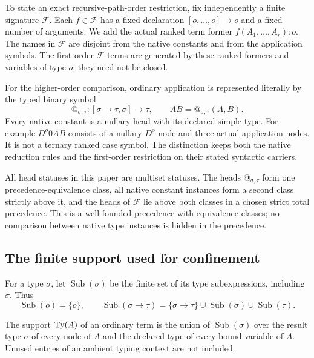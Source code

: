 To state an exact recursive-path-order restriction, fix independently a
finite signature $\mathcal F$.  Each $f\in\mathcal F$ has a fixed declaration
$[o,\ldots,o]\to o$ and a fixed number of arguments.  We add the actual
ranked term former $f(A_1,\ldots,A_r):o$.  The names in $\mathcal F$ are
disjoint from the native constants and from the application symbols.
The first-order $\mathcal F$-terms are generated by these ranked formers
and variables of type $o$; they need not be closed.

For the higher-order comparison, ordinary application is represented
literally by the typed binary symbol
\[
 @_{\sigma,\tau}:[\sigma\to\tau,\sigma]\to\tau,
 \qquad
 AB=@_{\sigma,\tau}(A,B).
\]
Every native constant is a nullary head with its declared simple type.
For example $D^o0AB$ consists of a nullary $D^o$ node and three actual
application nodes.  It is not a ternary ranked case symbol.  The distinction
keeps both the native reduction rules and the first-order restriction on
their stated syntactic carriers.

All head statuses in this paper are multiset statuses.  The heads
$@_{\sigma,\tau}$ form one precedence-equivalence class, all native
constant instances form a second class strictly above it, and the heads
of $\mathcal F$ lie above both classes in a chosen strict total precedence.
This is a well-founded precedence with equivalence classes; no comparison
between native type instances is hidden in the precedence.

\subsection{The finite support used for confinement}

For a type $\sigma$, let $\operatorname{Sub}(\sigma)$ be the finite set
of its type subexpressions, including $\sigma$.  Thus
\[
 \operatorname{Sub}(o)=\{o\},\qquad
 \operatorname{Sub}(\sigma\to\tau)
 =\{\sigma\to\tau\}\cup\operatorname{Sub}(\sigma)
                         \cup\operatorname{Sub}(\tau).
\]

\begin{definition}\label{def:typesupport}
The support $\operatorname{Ty}(A)$ of an ordinary term is the union of
$\operatorname{Sub}(\sigma)$ over the result type $\sigma$ of every
node of $A$ and the declared type of every bound variable of $A$.
Unused entries of an ambient typing context are not included.
\end{definition}

